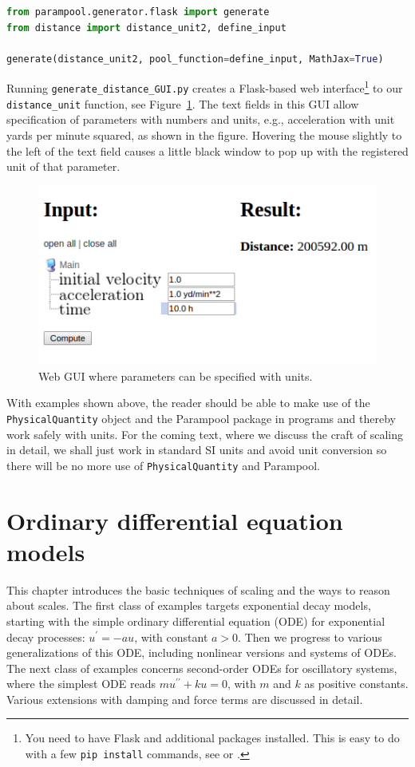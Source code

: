 \documentclass[graybox,envcountchap,sectrefs,final]{svmonodo}
\begin{document}
\begin{lstlisting}[language=Python,style=graycolor]
from parampool.generator.flask import generate
from distance import distance_unit2, define_input

generate(distance_unit2, pool_function=define_input, MathJax=True)
\end{lstlisting}
Running \Verb!generate_distance_GUI.py! creates a Flask-based web
interface\footnote{You need to have Flask and additional packages installed. This is easy to do with a few \texttt{pip install} commands, see \cite{parampool} or \cite{web4sciapps}.}
to our \Verb!distance_unit! function, see Figure~\ref{scale:dimunit:fig:GUI}.
The text fields in this GUI allow specification of parameters with
numbers and units, e.g., acceleration with unit yards per minute squared,
as shown in the figure. Hovering the mouse slightly to the left of
the text field causes a little black window to pop up with the registered unit
of that parameter.





\begin{figure}[!ht]  %
  \centerline{\includegraphics[width=0.5\linewidth]{fig-scaling/distance_GUI.png}}
  \caption{
  Web GUI where parameters can be specified with units. \label{scale:dimunit:fig:GUI}
  }
\end{figure}


With examples shown above, the reader should be able to make use of the
\texttt{PhysicalQuantity} object and the Parampool package in programs
and thereby work safely with units. For the coming text, where we discuss the
craft of scaling in detail, we shall just work in standard SI units
and avoid unit conversion so there will be no more use of
\texttt{PhysicalQuantity} and Parampool.


\chapter{Ordinary differential equation models}

This chapter introduces the basic techniques of scaling and the ways to
reason about scales. The first class of examples targets exponential
decay models, starting with the simple ordinary differential equation (ODE)
for exponential decay processes: $u^{\prime}=-au$, with constant $a>0$.
Then we progress to various generalizations of this ODE, including nonlinear
versions and systems of ODEs. The next class of examples concerns
second-order ODEs for oscillatory systems, where the simplest
ODE reads $mu^{\prime\prime} + ku=0$, with $m$ and $k$ as positive constants.
Various extensions with damping and force terms are discussed in detail.
\end{document}
